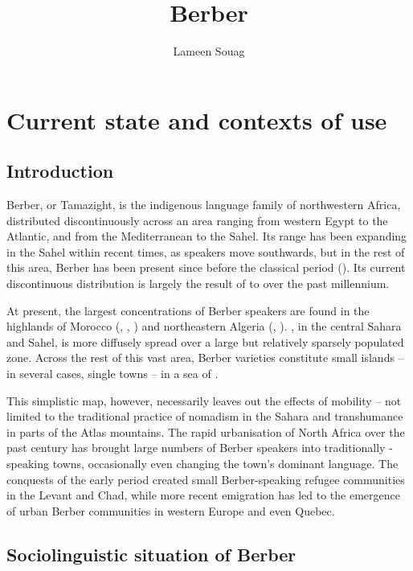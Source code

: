 \documentclass[output=paper]{langsci/langscibook}
\author{Lameen Souag\affiliation{CNRS, LACITO}}
\title{Berber}
\begin{document}
\maketitle 
  


 \section{Current state and contexts of use}


 \subsection{Introduction}


Berber, or {Tamazight}, is the indigenous language family of northwestern Africa, distributed discontinuously across an area ranging from western Egypt to the Atlantic, and from the Mediterranean to the Sahel. Its range has been expanding in the Sahel within recent times, as  speakers move southwards, but in the rest of this area, Berber has been present since before the classical period (\citealt{MúrciaSánchez2010}). Its current discontinuous distribution is largely the result of  to  over the past millennium.

At present, the largest concentrations of Berber speakers are found in the highlands of Morocco (, , ) and northeastern Algeria (, ). , in the central Sahara and Sahel, is more diffusely spread over a large but relatively sparsely populated zone. Across the rest of this vast area, Berber varieties constitute small islands – in several cases, single towns – in a sea of .

This simplistic map, however, necessarily leaves out the effects of mobility – not limited to the traditional practice of nomadism in the Sahara and transhumance in parts of the Atlas mountains. The rapid urbanisation of North Africa over the past century has brought large numbers of Berber speakers into traditionally -speaking towns, occasionally even changing the town's dominant language. The conquests of the early  period created small Berber-speaking refugee communities in the Levant and Chad, while more recent emigration has led to the emergence of urban Berber communities in western Europe and even Quebec.


 
 \subsection{Sociolinguistic situation of Berber}
\end{document}
